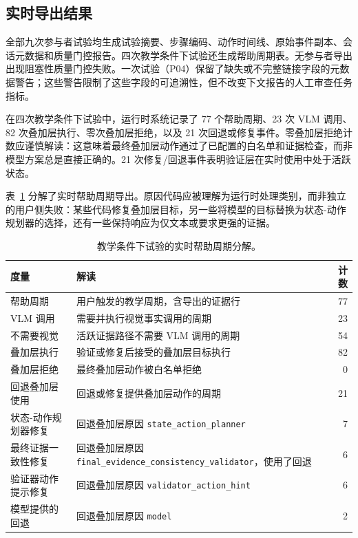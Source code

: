 \subsection{实时导出结果}

全部九次参与者试验均生成试验摘要、步骤编码、动作时间线、原始事件副本、会话元数据和质量门控报告。四次教学条件下试验还生成帮助周期表。无参与者导出出现阻塞性质量门控失败。一次试验（P04）保留了缺失或不完整链接字段的元数据警告；这些警告限制了这些字段的可追溯性，但不改变下文报告的人工审查任务指标。

在四次教学条件下试验中，运行时系统记录了 77 个帮助周期、23 次 VLM 调用、82 次叠加层执行、零次叠加层拒绝，以及 21 次回退或修复事件。零叠加层拒绝计数应谨慎解读：这意味着最终叠加层动作通过了已配置的白名单和证据检查，而非模型方案总是直接正确的。21 次修复/回退事件表明验证层在实时使用中处于活跃状态。

表~\ref{tab:rq1-help-cycle-breakdown} 分解了实时帮助周期导出。原因代码应被理解为运行时处理类别，而非独立的用户侧失败：某些代码修复叠加层目标，另一些将模型的目标替换为状态-动作规划器的选择，还有一些保持响应为仅文本或要求更强的证据。

\begin{table}[htbp]
\centering
\caption{教学条件下试验的实时帮助周期分解。}
\label{tab:rq1-help-cycle-breakdown}
\small
\begin{tabularx}{\textwidth}{@{}lXr@{}}
\toprule
\textbf{度量} & \textbf{解读} & \textbf{计数} \\
\midrule
帮助周期 & 用户触发的教学周期，含导出的证据行 & 77 \\
VLM 调用 & 需要并执行视觉事实调用的周期 & 23 \\
不需要视觉 & 活跃证据路径不需要 VLM 调用的周期 & 54 \\
叠加层执行 & 验证或修复后接受的叠加层目标执行 & 82 \\
叠加层拒绝 & 最终叠加层动作被白名单拒绝 & 0 \\
回退叠加层使用 & 回退或修复提供叠加层动作的周期 & 21 \\
状态-动作规划器修复 & 回退叠加层原因 \texttt{state\_action\_planner} & 7 \\
最终证据一致性修复 & 回退叠加层原因 \texttt{final\_evidence\_consistency\_validator}，使用了回退 & 6 \\
验证器动作提示修复 & 回退叠加层原因 \texttt{validator\_action\_hint} & 6 \\
模型提供的回退 & 回退叠加层原因 \texttt{model} & 2 \\
\bottomrule
\end{tabularx}
\end{table}

